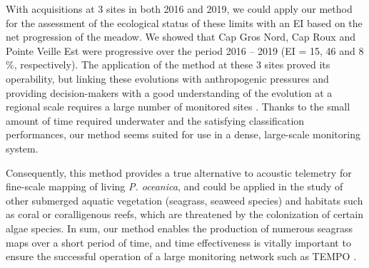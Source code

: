 With acquisitions at 3 sites in both 2016 and 2019, we could apply our method for the assessment of the ecological status of these limits with an EI based on the net progression of the meadow. We showed that Cap Gros Nord, Cap Roux and Pointe Veille Est were progressive over the period 2016 – 2019 (EI = 15, 46 and 8 \%, respectively). The application of the method at these 3 sites proved its operability, but linking these evolutions with anthropogenic pressures and providing decision-makers with a good understanding of the evolution at a regional scale  requires a large number of monitored sites \citep{marba_mediterranean_2014, holon_impact_2015, de_los_santos_recent_2019}. Thanks to the small amount of time required underwater and the satisfying classification performances, our method seems suited for use in a dense, large-scale monitoring system.

Consequently, this method provides a true alternative to acoustic telemetry for fine-scale mapping of living \textit{P. oceanica}, and could be applied in the study of other submerged aquatic vegetation (seagrass, seaweed species) and habitats such as coral or coralligenous reefs, which are threatened by the colonization of certain algae species. In sum, our method enables the production of numerous seagrass maps over a short period of time, and time effectiveness is vitally important to ensure the successful operation of a large monitoring network such as TEMPO \citep{andromede-oceanologie_tempo_2020}.
